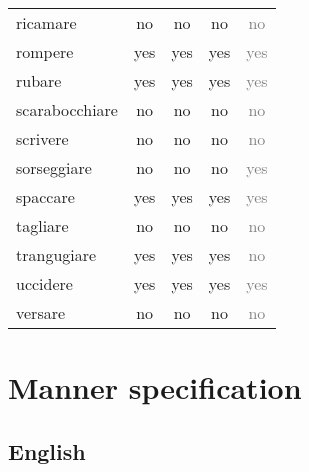 \begin{longtable}{lc|ccc}
ricamare       & no       & no     & no          & 	\textcolor{gray}{no}          \\
rompere        & yes      & yes    & yes         & 	\textcolor{gray}{yes}         \\
rubare         & yes      & yes    & yes         & 	\textcolor{gray}{yes}         \\
scarabocchiare & no       & no     & no          & 	\textcolor{gray}{no}          \\
scrivere       & no       & no     & no          & 	\textcolor{gray}{no}          \\
sorseggiare    & no       & no     & no          & 	\textcolor{gray}{yes}         \\
spaccare       & yes      & yes    & yes         & 	\textcolor{gray}{yes}         \\
tagliare       & no       & no     & no          & 	\textcolor{gray}{no}          \\
trangugiare    & yes      & yes    & yes         & 	\textcolor{gray}{no}          \\
uccidere       & yes      & yes    & yes         & 	\textcolor{gray}{yes}         \\
versare        & no       & no     & no          & 	\textcolor{gray}{no}
\end{longtable}



\section{Manner specification} 

\subsection{English}

